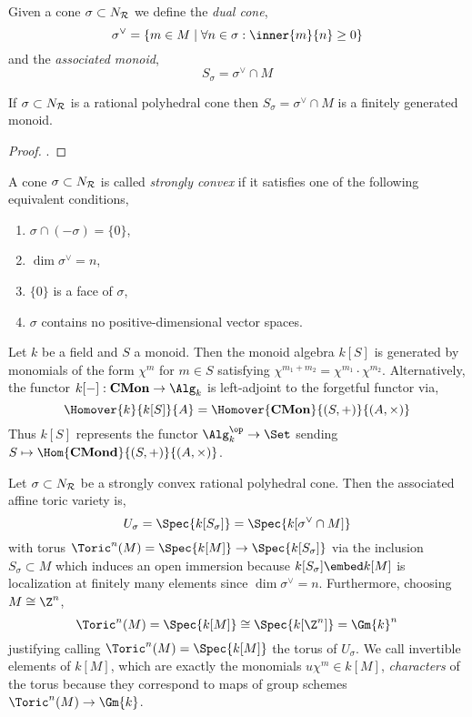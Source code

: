 \begin{defn}
Given a cone $\sigma \subset N_{\mathcal{R}}$ we define the \textit{dual cone},
\[ \sigma^\vee = \{ m \in M \mid \forall n \in \sigma : \inner{m}{n} \ge 0 \} \]
and the \textit{associated monoid},
\[ S_\sigma = \sigma^\vee \cap M \]
\end{defn}

\begin{lemma}[Gordan]
If $\sigma \subset N_{\mathcal{R}}$ is a rational polyhedral cone then $S_\sigma = \sigma^\vee \cap M$ is a finitely generated monoid. 
\end{lemma}

\begin{proof}
\cite[Prop. 1.2.17]{cox}.
\end{proof}

\begin{defn}
A cone $\sigma \subset N_{\mathcal{R}}$ is called \textit{strongly convex} if it satisfies one of the following equivalent conditions,
\begin{enumerate}
\item $\sigma \cap (-\sigma) = \{ 0 \}$,
\item $\dim{\sigma^\vee} = n$,
\item $\{ 0 \}$ is a face of $\sigma$,
\item $\sigma$ contains no positive-dimensional vector spaces.
\end{enumerate}
\end{defn}

\begin{defn}
Let $k$ be a field and $S$ a monoid. Then the monoid algebra $k[S]$ is generated by monomials of the form $\chi^m$ for $m \in S$ satisfying $\chi^{m_1 + m_2} = \chi^{m_1} \cdot \chi^{m_2}$. 
Alternatively, the functor $k[-] : \mathbf{CMon} \to \Alg_k$ is left-adjoint to the forgetful functor via,
\[ \Homover{k}{k[S]}{A} = \Homover{\mathbf{CMon}}{(S, +)}{(A, \times)} \]
Thus $k[S]$ represents the functor $\Alg_k^\op \to \Set$ sending $S \mapsto \Hom{\mathbf{CMond}}{(S, +)}{(A, \times)}$.
\end{defn}

\begin{defn}
Let $\sigma \subset N_{\mathcal{R}}$ be a strongly convex rational polyhedral cone. Then the associated affine toric variety is,
\[ U_\sigma = \Spec{k[S_\sigma]} = \Spec{k[\sigma^\vee \cap M]} \]
with torus $\Toric^n(M) = \Spec{k[M]} \to \Spec{k[S_\sigma]}$ via the inclusion $S_\sigma \subset M$ which induces an open immersion because  $k[S_\sigma] \embed k[M]$ is localization at finitely many elements since $\dim{\sigma^\vee} = n$. Furthermore, choosing $M \cong \Z^n$,
\[ \Toric^n(M) = \Spec{k[M]} \cong \Spec{k[\Z^n]} = \Gm{k}^n \]
justifying calling $\Toric^n(M) = \Spec{k[M]}$ the torus of $U_\sigma$.
We call invertible elements of $k[M]$, which are exactly the monomials $u \chi^m \in k[M]$, \textit{characters} of the torus because they correspond to maps of group schemes $\Toric^n(M) \to \Gm{k}$.
\end{defn}

